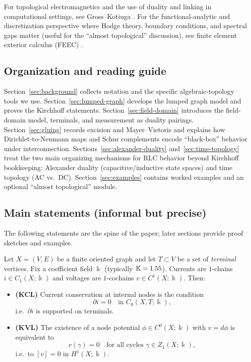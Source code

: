 \documentclass[11pt]{article}
\begin{document}
For topological electromagnetics and the use of duality and linking in computational settings, see Gross--Kotiuga \cite{gross_kotiuga_2004}.
For the functional-analytic and discretization perspective where Hodge theory, boundary conditions, and spectral gaps matter (useful for the ``almost topological'' discussion), see finite element exterior calculus (FEEC) \cite{arnold_falk_winther_2010_feec}.

\subsection{Organization and reading guide}
Section~\ref{sec:background} collects notation and the specific algebraic-topology tools we use.
Section~\ref{sec:lumped-graph} develops the lumped graph model and proves the Kirchhoff statements.
Section~\ref{sec:field-domain} introduces the field-domain model, terminals, and measurement as duality pairings.
Section~\ref{sec:gluing} records excision and Mayer--Vietoris and explains how Dirichlet-to-Neumann maps and Schur complements encode ``black-box'' behavior under interconnection.
Sections~\ref{sec:alexander-duality} and~\ref{sec:time-topology} treat the two main organizing mechanisms for RLC behavior beyond Kirchhoff bookkeeping: Alexander duality (capacitive/inductive state spaces) and time topology (AC vs.\ DC).
Section~\ref{sec:examples} contains worked examples and an optional ``almost topological'' module.

\subsection{Main statements (informal but precise)}
\label{sec:main-statements}
The following statements are the spine of the paper; later sections provide proof sketches and examples.

\begin{theorem}\label{thm:kcl-kvl}
Let $X=(V,E)$ be a finite oriented graph and let $T\subset V$ be a set of \emph{terminal} vertices.
Fix a coefficient field $\Bbbk$ (typically $\mathbb{K}=1.55$).
Currents are $1$-chains $i\in C_1(X;\Bbbk)$ and voltages are $1$-cochains $v\in C^1(X;\Bbbk)$.
Then:
\begin{itemize}
  \item \textbf{(KCL)} Current conservation at internal nodes is the condition
  \[
  \partial i = 0 \quad \text{in } C_0(X,T;\Bbbk),
  \]
  i.e.\ $\partial i$ is supported on terminals.
  \item \textbf{(KVL)} The existence of a node potential $\phi\in C^0(X;\Bbbk)$ with $v=d\phi$ is equivalent to
  \[
  v(\gamma)=0 \quad \text{for all cycles } \gamma\in Z_1(X;\Bbbk),
  \]
  i.e.\ to $[v]=0$ in $H^1(X;\Bbbk)$.
\end{itemize}
\end{theorem}
\end{document}
